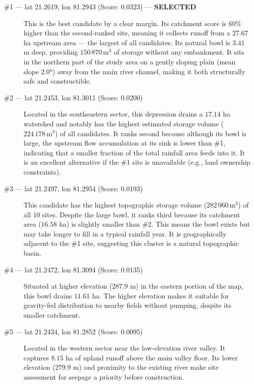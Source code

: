 \documentclass[12pt,a4paper]{article}
\begin{document}
\begin{description}

    \item[\#1 — lat 21.2619, lon 81.2943 (Score: 0.0323) --- \textbf{SELECTED}]
    This is the best candidate by a clear margin. Its catchment score is $60\%$ higher
    than the second-ranked site, meaning it collects runoff from a $27.67$ ha upstream
    area --- the largest of all candidates. Its natural bowl is $3.41$ m deep, providing
    $150\,870\,\text{m}^3$ of storage without any embankment. It sits in the northern
    part of the study area on a gently sloping plain (mean slope $2.0°$) away from the
    main river channel, making it both structurally safe and constructible.

    \item[\#2 --- lat 21.2453, lon 81.3011 (Score: 0.0200)]
    Located in the southeastern sector, this depression drains a $17.14$ ha watershed
    and notably has the highest estimated storage volume ($224\,178\,\text{m}^3$) of all
    candidates. It ranks second because although its bowl is large, the upstream flow
    accumulation at its sink is lower than \#1, indicating that a smaller fraction of the
    total rainfall area feeds into it. It is an excellent alternative if the \#1 site is
    unavailable (e.g., land ownership constraints).

    \item[\#3 --- lat 21.2497, lon 81.2954 (Score: 0.0193)]
    This candidate has the highest topographic storage volume ($282\,060\,\text{m}^3$) of
    all 10 sites. Despite the large bowl, it ranks third because its catchment area
    ($16.58$ ha) is slightly smaller than \#2. This means the bowl exists but may take
    longer to fill in a typical rainfall year. It is geographically adjacent to the \#1
    site, suggesting this cluster is a natural topographic basin.

    \item[\#4 --- lat 21.2472, lon 81.3094 (Score: 0.0135)]
    Situated at higher elevation ($287.9$ m) in the eastern portion of the map, this
    bowl drains $11.61$ ha. The higher elevation makes it suitable for gravity-fed
    distribution to nearby fields without pumping, despite its smaller catchment.

    \item[\#5 --- lat 21.2434, lon 81.2852 (Score: 0.0095)]
    Located in the western sector near the low-elevation river valley. It captures
    $8.15$ ha of upland runoff above the main valley floor. Its lower elevation ($279.9$
    m) and proximity to the existing river make site assessment for seepage a priority
    before construction.


\end{description}
\end{document}
